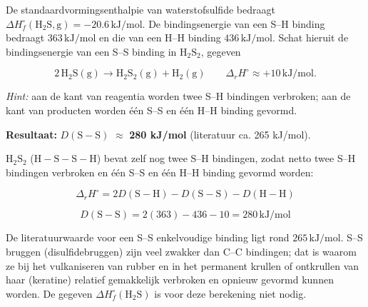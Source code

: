 \begin{oefening}
De standaardvormingsenthalpie van waterstofsulfide bedraagt \(\Delta H_f^\circ(\mathrm{H_2S,g}) = -20.6\,\mathrm{kJ/mol}\). De bindingsenergie van een S--H binding bedraagt \(363\,\mathrm{kJ/mol}\) en die van een H--H binding \(436\,\mathrm{kJ/mol}\). Schat hieruit de bindingsenergie van een S--S binding in \(\mathrm{H_2S_2}\), gegeven

\[
\mathrm{2\,H_2S(g) \rightarrow H_2S_2(g) + H_2(g)} \qquad \Delta_r H^\circ \approx +10\,\mathrm{kJ/mol}.
\]

\emph{Hint:} aan de kant van reagentia worden twee S--H bindingen verbroken; aan de kant van producten worden één S--S en één H--H binding gevormd.
\end{oefening}
\begin{oplossing}
\textbf{Resultaat:} \(D(\mathrm{S{-}S})\) \ensuremath{\approx{}} \textbf{280 kJ/mol} (literatuur ca. 265 kJ/mol).

\(\mathrm{H_2S_2}\) (\(\mathrm{H{-}S{-}S{-}H}\)) bevat zelf nog twee S--H bindingen, zodat netto twee S--H bindingen verbroken en één S--S en één H--H binding gevormd worden:

\[
\Delta_r H^\circ = 2D(\mathrm{S{-}H}) - D(\mathrm{S{-}S}) - D(\mathrm{H{-}H})
\]

\[
D(\mathrm{S{-}S}) = 2(363) - 436 - 10 = 280\,\mathrm{kJ/mol}
\]

De literatuurwaarde voor een S--S enkelvoudige binding ligt rond \(265\,\mathrm{kJ/mol}\). S--S bruggen (disulfidebruggen) zijn veel zwakker dan C--C bindingen; dat is waarom ze bij het vulkaniseren van rubber en in het permanent krullen of ontkrullen van haar (keratine) relatief gemakkelijk verbroken en opnieuw gevormd kunnen worden. De gegeven \(\Delta H_f^\circ(\mathrm{H_2S})\) is voor deze berekening niet nodig.
\end{oplossing}

